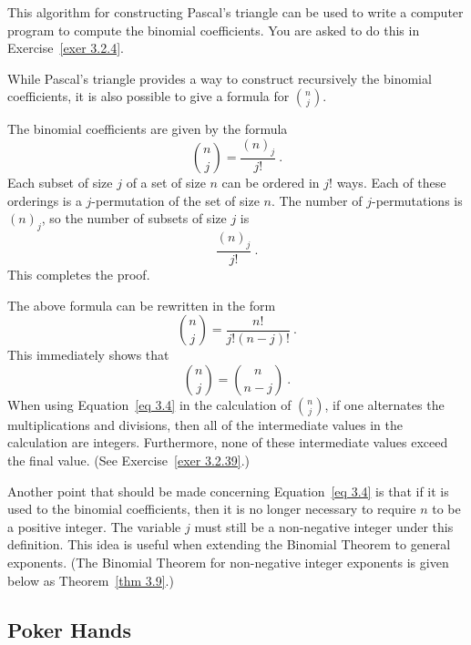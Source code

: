 This algorithm for constructing Pascal's triangle can be used to write a computer
program to compute the binomial coefficients.  You are asked to do this in
Exercise~\ref{exer 3.2.4}.
\par
While Pascal's triangle provides a way to construct recursively the binomial
coefficients, it is also possible to give a formula for $n \choose j$.

\begin{theorem}\label{thm 3.7}  The binomial coefficients are given by the formula
\begin{equation} {n \choose j }= \frac{(n)_j}{j!}\ .
\label{eq 3.4}  
\end{equation}                                                                        
\proof Each subset of size $j$ of a set of size $n$ can be ordered in $j!$ ways. Each
of these orderings is a $j$-permutation of the set of size $n$.  The number of
$j$-permutations is $(n)_j$, so the number of subsets of size $j$ is
$$
\frac{(n)_j}{j!}\ .
$$ This completes the proof.
\end{theorem}

The above formula can be rewritten in the form 
$${n \choose j} = \frac{n!}{j!(n-j)!}\ .$$ This immediately shows that
$$ {n \choose j} = {n \choose {n-j}}\ .
$$ When using Equation~\ref{eq 3.4} in the calculation of ${n \choose j}$,  if one alternates
the multiplications and divisions, then all of the intermediate values in the
calculation are integers.  Furthermore, none of these intermediate values exceed the
final value. (See Exercise~\ref{exer 3.2.39}.)
\par
Another point that should be made concerning Equation~\ref{eq 3.4} is that if it is 
used to  the binomial coefficients, then it is no longer necessary to require
$n$ to be a positive integer.  The variable $j$ must still be a non-negative integer under
this definition.  This idea is useful when extending the Binomial Theorem to general exponents.  
(The Binomial Theorem for non-negative integer exponents is given below as Theorem~\ref{thm 3.9}.)
\subsection*{Poker Hands}

